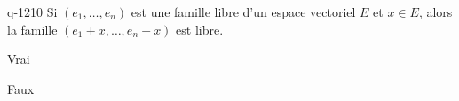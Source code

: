 \begin{truefalse}{q-1210}
Si $(e_1,\ldots,e_n)$ est une famille libre d'un espace vectoriel $E$ et $x\in E$, alors la famille $(e_1+x,\ldots,e_n+x)$ est libre.
\item Vrai
\item* Faux
\end{truefalse}

